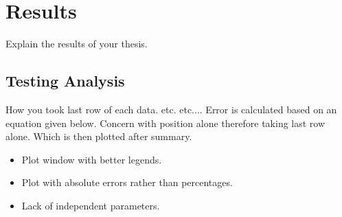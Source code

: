 \chapter{Results} \label{Chap:Results}

Explain the results of your thesis.

\section{Testing Analysis}
How you took last row of each data. etc. etc.... Error is calculated based on an equation given below. Concern with position alone therefore taking last row alone. Which is then plotted after summary.

\begin{itemize}
    \item Plot window with better legends.
    \item Plot with absolute errors rather than percentages.
    \item Lack of independent parameters.
\end{itemize}